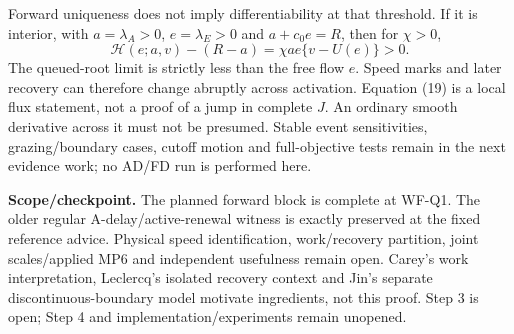 \documentclass[11pt,a4paper]{article}
\begin{document}
Forward uniqueness does not imply differentiability at that threshold.
If it is interior, with $a=\lambda_A>0$, $e=\lambda_E>0$ and
$a+c_0e=R$, then for $\chi>0$,
\begin{equation}
 \mathcal H(e;a,v)-(R-a)=\chi a e\{v-U(e)\}>0.\tag{19}
\end{equation}
The queued-root limit is strictly less than the free flow $e$. Speed marks
and later recovery can therefore change abruptly across activation.
Equation (19) is a local flux statement, not a proof of a jump in complete
$J$. An ordinary smooth derivative across it must not be presumed. Stable
event sensitivities, grazing/boundary cases, cutoff motion and full-objective
tests remain in the next evidence work; no AD/FD run is performed here.

\textbf{Scope/checkpoint.} The planned forward block is complete at WF-Q1.
The older regular A-delay/active-renewal witness is exactly preserved at the
fixed reference advice. Physical speed identification, work/recovery
partition, joint scales/applied MP6 and independent usefulness remain open.
Carey's work interpretation, Leclercq's isolated recovery context and Jin's
separate discontinuous-boundary model motivate ingredients, not this proof.
Step 3 is open; Step 4 and implementation/experiments remain unopened.
\end{document}
